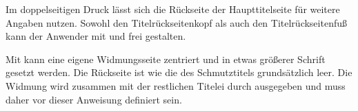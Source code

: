 \begin{Declaration}{}
\begin{Declaration}{}
\begin{Declaration}{}
\begin{Declaration}{}
\begin{Declaration}{}
\begin{Declaration}{}
\begin{Declaration}{}
\begin{Declaration}{}
\begin{Declaration}{}
%
Im doppelseitigen Druck lässt sich die Rückseite der Haupttitelseite für 
weitere Angaben nutzen. Sowohl den Titelrückseitenkopf als auch den
Titelrückseitenfuß kann der Anwender mit  und 
 frei gestalten.

Mit  kann eine eigene Widmungsseite zentriert und in etwas 
größerer Schrift gesetzt werden. Die Rückseite ist wie die des Schmutztitels 
grundsätzlich leer. Die Widmung wird zusammen mit der restlichen Titelei durch 
 ausgegeben und muss daher vor dieser Anweisung definiert sein.
\end{Declaration}
\end{Declaration}
\end{Declaration}
\end{Declaration}
\end{Declaration}
\end{Declaration}
\end{Declaration}
\end{Declaration}
\end{Declaration}



